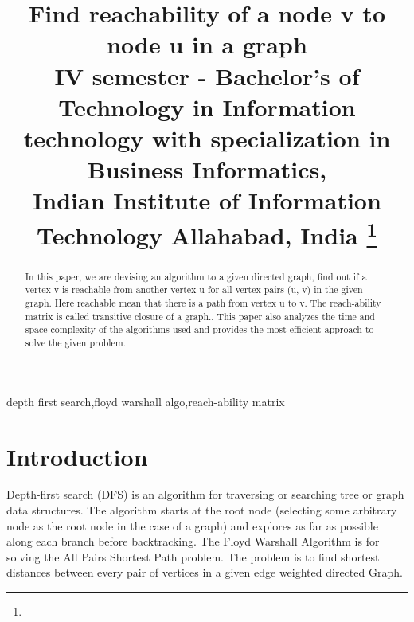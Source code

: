 \documentclass[conference]{IEEEtran}
\begin{document}
\title{Find reachability of a node v to node u in a graph
\\
{\footnotesize {
IV semester - Bachelor’s of Technology in Information technology with specialization in Business Informatics,\\
Indian Institute of Information Technology Allahabad, India
}}
\thanks{}
}

\author{
\and
{}
\and
{}
}


\maketitle

\begin{abstract}
In this paper, we are devising an algorithm to a given directed graph, find out if a vertex v is reachable from another vertex u for all vertex pairs (u, v) in the given graph. Here reachable mean that there is a path from vertex u to v. The reach-ability matrix is called transitive closure of a graph.. This paper also analyzes the time and space complexity of the algorithms used and provides the most efficient approach to solve the given problem.
\end{abstract}
\bigskip
\begin{IEEEkeywords}
depth first search,floyd warshall algo,reach-ability matrix
\end{IEEEkeywords}

\section{Introduction}
Depth-first search (DFS) is an algorithm for traversing or searching tree or graph data structures. The algorithm starts at the root node (selecting some arbitrary node as the root node in the case of a graph) and explores as far as possible along each branch before backtracking.
The Floyd Warshall Algorithm is for solving the All Pairs Shortest Path problem. The problem is to find shortest distances between every pair of vertices in a given edge weighted directed Graph.
\end{document}

